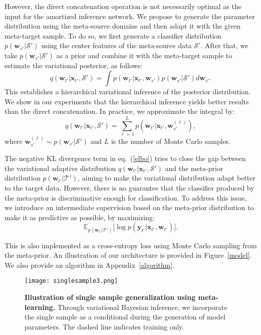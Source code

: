 \documentclass{article} \usepackage[table]{xcolor}
\newcommand{\x}{\mathbf{x}}
\newcommand{\y}{\mathbf{y}}
\newcommand{\w}{\mathbf{w}}
\begin{document}
However, the direct concatenation operation is not necessarily optimal as the input for the amortized inference network. 
We propose to generate the parameter distribution using the meta-source domains and then adapt it with the given meta-target sample.
To do so, we first generate a classifier distribution $p(\w_{s'}|\mathcal{S'})$ using the center features of the meta-source data $\mathcal{S'}$.
After that, we take $p(\w_{s'}|\mathcal{S'})$ as a prior and combine it with the meta-target sample to estimate the variational posterior, as follows:
\begin{equation}
\label{hierar}
    q(\w_{t'}|\x_{t'}, \mathcal{S'}) = \int{p(\w_{t'}|\x_{t'}, \w_{s'})} p(\w_{s'}|\mathcal{S'}) d\w_{s'}.
\end{equation}
This establishes a hierarchical variational inference of the posterior distribution. We show in our experiments that the hierarchical inference yields better results than the direct concatenation.
In practice, we approximate the integral by:
\begin{equation}
q(\w_{t'}|\x_{t'}, \mathcal{S'}) = \sum^{L}_{\ell=1}p(\w_{t'}|\x_{t'}, \w^{(\ell)}_{s'}),
    \label{qws}
\end{equation}
where $\w^{(\ell)}_{s'} \sim p(\w_{s'}|\mathcal{S'})$ and $L$ is the number of Monte Carlo samples.

The negative KL divergence term in eq.~(\ref{elbo}) tries to close the gap between the variational adaptive distribution $q(\w_{t'}|\x_{t'}, \mathcal{S'})$ and the meta-prior distribution $p(\w_{t'}|\mathcal{T'})$, aiming to make the variational distribution adapt better to the target data. However, there is no guarantee that the classifier produced by the meta-prior is discriminative enough for classification.
To address this issue, we introduce an intermediate supervision based on the meta-prior distribution to make it as predictive as possible, by maximizing: 
\begin{equation}
\label{prior}
    \mathbb{E}_{p(\w_{t'}|\mathcal{T'})}\big[\log p(\y_{t'}|\x_{t'}, \w_{t'})\big].
\end{equation}

This is also implemented as a cross-entropy loss using Monte Carlo sampling from the meta-prior.
An illustration of our architecture is provided in Figure~\ref{model}. We also provide an algorithm in Appendix~\ref{algorithm}.


\begin{figure*}[t] 
\centering 
\centerline{\texttt{[image: singlesample3.png]}} 
\vspace{-2mm}
\caption{\textbf{Illustration of single sample generalization using meta-learning.} Through variational Bayesian inference, we incorporate the single sample as a conditional during the generation of model parameters. The dashed line indicates training only.  } 
\label{adapt}
\vspace{-2mm}
\end{figure*} 
\end{document}

